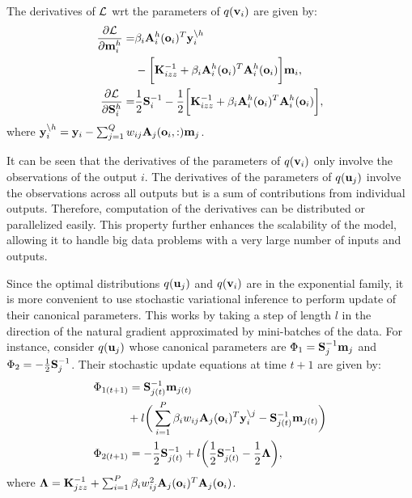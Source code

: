\newcommand{\Lhi}{\calL^h_i}
\newcommand{\Kizz}{\mat{K}_{izz}}
\noindent The derivatives of $\calL$ wrt the parameters of $q(\v_i)$ are given by:
\newcommand{\ynoh}{\y_i^{\backslash h}}
\begin{align}
\nonumber
\deriv{\calL}{\mhi}
= & \beta_i \Ahi(\oi)^T \ynoh  \\
&- \bigg[\Kizz^{-1} +  \beta_i \Ahi(\oi)^T \Ahi(\oi) \bigg] \m_i \text{,} \\
\deriv{\calL}{\Shi} 
=& \frac{1}{2} \S_i^{-1} - \frac{1}{2} \bigg[ \Kizz^{-1} + \beta_i \Ahi(\oi)^T \Ahi(\oi) \bigg] ,
\end{align}
where $\ynoh = \y_i - \sum_{j=1}^Q w_{ij} \A_j(\oi,:) \m_j$.

\noindent It can be seen that the derivatives of the parameters of $q(\v_i)$ only involve the observations of the output $i$.
The derivatives of the parameters of $q(\u_j)$ involve the observations across all outputs but is a sum of contributions from individual outputs.
Therefore, computation of the derivatives can be distributed or parallelized easily.
This property further enhances the scalability of the model, allowing it to handle big data problems with a very large number of inputs and outputs.

Since the optimal distributions $q(\u_j)$ and $q(\v_i)$ are in the exponential family, it is more convenient to use stochastic variational inference \citep{hensman2012fast,hensmangaussian} to perform update of their canonical parameters.
This works by taking a step of length $l$ in the direction of the natural gradient approximated by mini-batches of the data.
For instance, consider $q(\u_j)$ whose canonical parameters are $\Phi_1 = \S_j^{-1} \m_j$ and $\Phi_2 = -\frac{1}{2}\S_j^{-1}$.
Their stochastic update equations at time $t + 1$ are given by:
\begin{align}
\nonumber
& \Phi_{1(t+1)} = \S_{j(t)}^{-1} \m_{j(t)}  \\
 & \quad \qquad +  l \bigg(\sum_{i=1}^P \beta_i w_{ij} \A_j(\oi)^T \ynoj - \S_{j(t)}^{-1} \m_{j(t)} \bigg) \\
& \Phi_{2(t+1)} = -\frac{1}{2} \S_{j(t)}^{-1} + l \bigg(\frac{1}{2} \S_{j(t)}^{-1} - \frac{1}{2} \mat{\Lambda} \bigg),
\end{align}
\normalsize
where $\mat{\Lambda} = \Kjzz^{-1} + \sum_{i=1}^P \beta_i w_{ij}^2 \A_j(\oi)^T \A_j(\oi)$.
%
